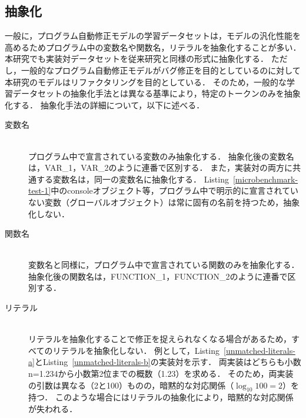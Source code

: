 \documentclass[11pt]{jreport}
\newcommand{\fix}[1]{#1}
\begin{document}


\subsection{抽象化}


一般に，プログラム自動修正モデルの学習データセットは，モデルの汎化性能を高めるためプログラム中の変数名や関数名，リテラルを抽象化することが多い\fix{\cite{Tufano_2019, Tufano_2021}}．
本研究でも実装対データセットを\fix{従来研究\cite{Tufano_2019}と同様の形式に}抽象化する．
ただし，一般的なプログラム自動修正モデルがバグ修正を目的としているのに対して本研究のモデルはリファクタリングを目的としている．
そのため，一般的な学習データセットの抽象化手法とは異なる基準により，特定のトークンのみを抽象化する．
抽象化手法の詳細について，以下に述べる．


\begin{description}

\item[変数名]\mbox{}\\
プログラム中で宣言されている変数のみ抽象化する．
抽象化後の変数名は，VAR\_1，VAR\_2のように連番で区別する．
また，実装対の両方に共通する変数名は，同一の変数名に抽象化する．
Listing~\ref{microbenchmark-test-1}中のconsoleオブジェクト等，プログラム中で明示的に宣言されていない変数（グローバルオブジェクト）は常に固有の名前を持つため，抽象化しない．

\item[関数名]\mbox{}\\
変数名と同様に，プログラム中で宣言されている関数のみを抽象化する．
抽象化後の関数名は，FUNCTION\_1，FUNCTION\_2のように連番で区別する．

\item[リテラル]\mbox{}\\
リテラルを抽象化することで修正を捉えられなくなる場合があるため，すべてのリテラルを抽象化しない．
例として，Listing~\ref{unmatched-literals-a}とListing~\ref{unmatched-literals-b}の実装対を示す．
両実装はどちらも小数n=1.234から小数第2位までの概数（1.23）を求める．
そのため，両実装の引数は異なる（2と100）ものの，暗黙的な対応関係（\begin{math}\log_{10} 100=2\end{math}）を持つ．
このような場合にはリテラルの抽象化により，暗黙的な対応関係が失われる．

\end{description}
\end{document}
